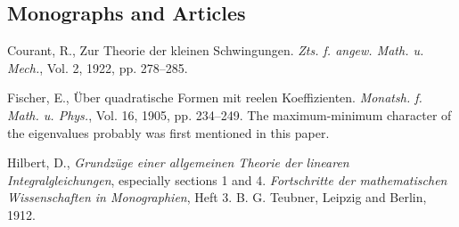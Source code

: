 \subsection*{Monographs and Articles}
Courant, R., Zur Theorie der kleinen Schwingungen. \emph{Zts. f. angew. Math. u. Mech.}, Vol. 2, 1922, pp. 278--285.

Fischer, E., \"Uber quadratische Formen mit reelen Koeffizienten. \emph{Monatsh. f. Math. u. Phys.}, Vol. 16, 1905, pp. 234--249. The maximum-minimum character of the eigenvalues probably was first mentioned in this paper.

Hilbert, D., \emph{Grundz\"uge einer allgemeinen Theorie der linearen Integralgleichungen}, especially sections 1 and 4. \emph{Fortschritte der mathematischen Wissenschaften in Monographien}, Heft 3. B. G. Teubner, Leipzig and Berlin, 1912.
